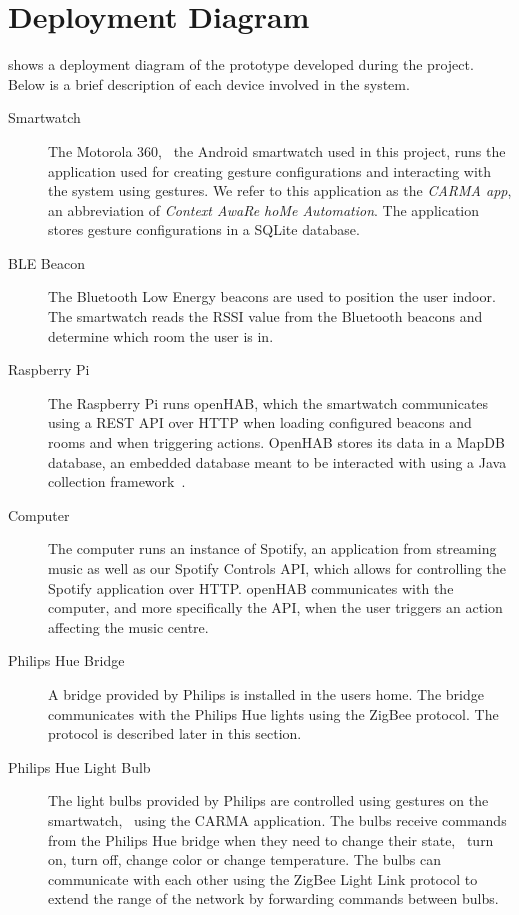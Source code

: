 \section{Deployment Diagram}

 shows a deployment diagram of the prototype developed during the project. Below is a brief description of each device involved in the system.

\begin{description}
\item[Smartwatch] The Motorola 360, \ie~the Android smartwatch used in this project, runs the application used for creating gesture configurations and interacting with the system using gestures. We refer to this application as the \emph{CARMA app}, an abbreviation of \emph{Context AwaRe hoMe Automation}. The application stores gesture configurations in a SQLite database.
\item[BLE Beacon] The Bluetooth Low Energy beacons are used to position the user indoor. The smartwatch reads the RSSI value from the Bluetooth beacons and determine which room the user is in.
\item[Raspberry Pi] The Raspberry Pi runs openHAB, which the smartwatch communicates using a REST API over HTTP when loading configured beacons and rooms and when triggering actions. OpenHAB stores its data in a MapDB database, an embedded database meant to be interacted with using a Java collection framework~\cite{mapdb:mapdb}.
\item[Computer] The computer runs an instance of Spotify, an application from streaming music as well as our Spotify Controls API, which allows for controlling the Spotify application over HTTP. openHAB communicates with the computer, and more specifically the API, when the user triggers an action affecting the music centre.
\item[Philips Hue Bridge] A bridge provided by Philips is installed in the users home. The bridge communicates with the Philips Hue lights using the ZigBee protocol. The protocol is described later in this section.
\item[Philips Hue Light Bulb] The light bulbs provided by Philips are controlled using gestures on the smartwatch, \ie~using the CARMA application. The bulbs receive commands from the Philips Hue bridge when they need to change their state, \eg~turn on, turn off, change color or change temperature. The bulbs can communicate with each other using the ZigBee Light Link protocol to extend the range of the network by forwarding commands between bulbs.
\end{description}

